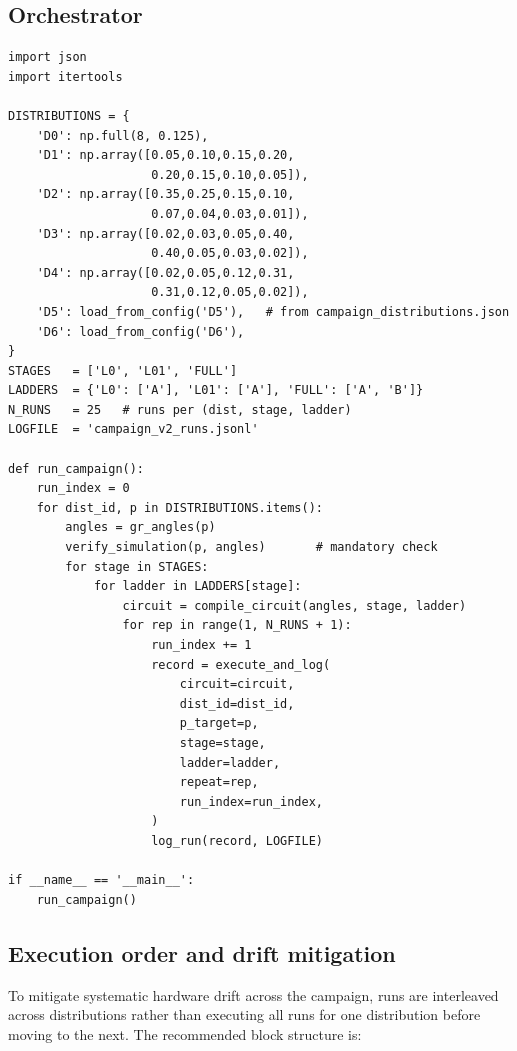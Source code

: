 \documentclass[11pt,a4paper]{article}
\begin{document}
\subsection{Orchestrator}

\begin{lstlisting}[caption={Campaign orchestrator: iterates over all
  distributions, stages, and ladders.}]
import json
import itertools

DISTRIBUTIONS = {
    'D0': np.full(8, 0.125),
    'D1': np.array([0.05,0.10,0.15,0.20,
                    0.20,0.15,0.10,0.05]),
    'D2': np.array([0.35,0.25,0.15,0.10,
                    0.07,0.04,0.03,0.01]),
    'D3': np.array([0.02,0.03,0.05,0.40,
                    0.40,0.05,0.03,0.02]),
    'D4': np.array([0.02,0.05,0.12,0.31,
                    0.31,0.12,0.05,0.02]),
    'D5': load_from_config('D5'),   # from campaign_distributions.json
    'D6': load_from_config('D6'),
}
STAGES   = ['L0', 'L01', 'FULL']
LADDERS  = {'L0': ['A'], 'L01': ['A'], 'FULL': ['A', 'B']}
N_RUNS   = 25   # runs per (dist, stage, ladder)
LOGFILE  = 'campaign_v2_runs.jsonl'

def run_campaign():
    run_index = 0
    for dist_id, p in DISTRIBUTIONS.items():
        angles = gr_angles(p)
        verify_simulation(p, angles)       # mandatory check
        for stage in STAGES:
            for ladder in LADDERS[stage]:
                circuit = compile_circuit(angles, stage, ladder)
                for rep in range(1, N_RUNS + 1):
                    run_index += 1
                    record = execute_and_log(
                        circuit=circuit,
                        dist_id=dist_id,
                        p_target=p,
                        stage=stage,
                        ladder=ladder,
                        repeat=rep,
                        run_index=run_index,
                    )
                    log_run(record, LOGFILE)

if __name__ == '__main__':
    run_campaign()
\end{lstlisting}

\subsection{Execution order and drift mitigation}

To mitigate systematic hardware drift across the campaign, runs
are interleaved across distributions rather than executing all
runs for one distribution before moving to the next. The
recommended block structure is:
\end{document}
